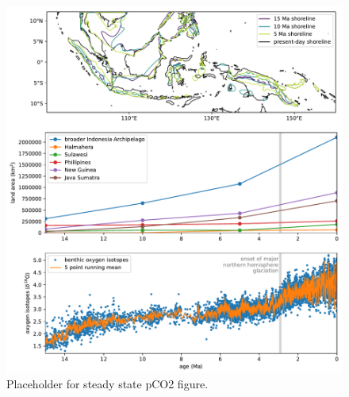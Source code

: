 \documentclass[11pt,letterpaper]{article}
\begin{document}
\begin{figure}
    \centering
    \includegraphics[width=1\textwidth]{Manuscript/Figures/shoreline_growth.pdf}
    \caption{Placeholder for steady state pCO2 figure.}
    \label{fig:scenario_pCO2}
\end{figure}

\clearpage
\newpage
\footnotesize

\singlespacing



\end{document}

